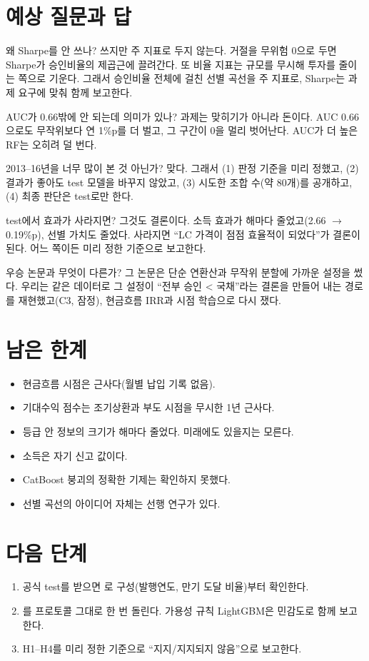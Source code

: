 \section{예상 질문과 답}
\begin{qa}{왜 Sharpe를 안 쓰나?}
쓰지만 주 지표로 두지 않는다. 거절을 무위험 0으로 두면 Sharpe가 승인비율의 제곱근에 끌려간다. 또 비율 지표는 규모를 무시해 투자를 줄이는 쪽으로 기운다. 그래서 승인비율 전체에 걸친 선별 곡선을 주 지표로, Sharpe는 과제 요구에 맞춰 함께 보고한다.
\end{qa}
\begin{qa}{AUC가 0.66밖에 안 되는데 의미가 있나?}
과제는 맞히기가 아니라 돈이다. AUC 0.66으로도 무작위보다 연 1\%p를 더 벌고, 그 구간이 0을 멀리 벗어난다. AUC가 더 높은 RF는 오히려 덜 번다.
\end{qa}
\begin{qa}{2013--16년을 너무 많이 본 것 아닌가?}
맞다. 그래서 (1) 판정 기준을 미리 정했고, (2) 결과가 좋아도 test 모델을 바꾸지 않았고, (3) 시도한 조합 수(약 80개)를 공개하고, (4) 최종 판단은 test로만 한다.
\end{qa}
\begin{qa}{test에서 효과가 사라지면?}
그것도 결론이다. 소득 효과가 해마다 줄었고(2.66 \ensuremath{\to} 0.19\%p), 선별 가치도 줄었다. 사라지면 ``LC 가격이 점점 효율적이 되었다''가 결론이 된다. 어느 쪽이든 미리 정한 기준으로 보고한다.
\end{qa}
\begin{qa}{우승 논문과 무엇이 다른가?}
그 논문은 단순 연환산과 무작위 분할에 가까운 설정을 썼다. 우리는 같은 데이터로 그 설정이 ``전부 승인 < 국채''라는 결론을 만들어 내는 경로를 재현했고(C3, 잠정), 현금흐름 IRR과 시점 학습으로 다시 쟀다.
\end{qa}

\section{남은 한계}
\begin{itemize}[leftmargin=*]
\item 현금흐름 시점은 근사다(월별 납입 기록 없음).
\item 기대수익 점수는 조기상환과 부도 시점을 무시한 1년 근사다.
\item 등급 안 정보의 크기가 해마다 줄었다. 미래에도 있을지는 모른다.
\item 소득은 자기 신고 값이다.
\item CatBoost 붕괴의 정확한 기제는 확인하지 못했다.
\item 선별 곡선의 아이디어 자체는 선행 연구가 있다.
\end{itemize}

\section{다음 단계}
\begin{enumerate}[leftmargin=*]
\item 공식 test를 받으면 로 구성(발행연도, 만기 도달 비율)부터 확인한다.
\item {}를 프로토콜 그대로 한 번 돌린다. 가용성 규칙 LightGBM은 민감도로 함께 보고한다.
\item H1--H4를 미리 정한 기준으로 ``지지/지지되지 않음''으로 보고한다.
\end{enumerate}
